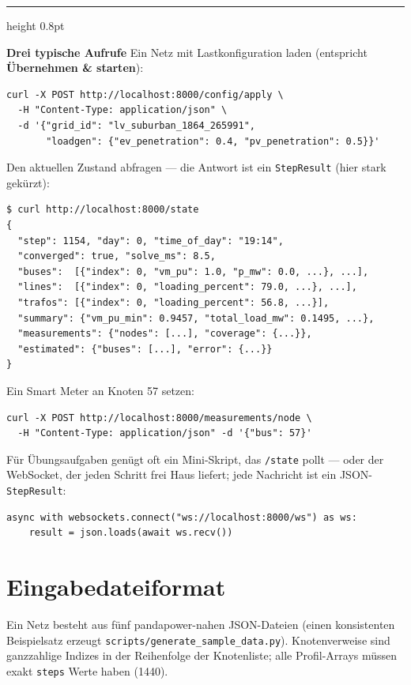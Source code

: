 \documentclass[11pt,a4paper,parskip=half]{scrreprt}
\newcommand{\ui}[1]{\textsf{\bfseries #1}}          %
\newcommand{\api}[1]{\texttt{#1}}                    %
\newenvironment{beispiel}[1][Beispiel]
  {\par\medskip
   {\color{bsp}\hrule height 0.8pt}\nopagebreak\smallskip
   \noindent\textbf{\textsf{\textcolor{bsp}{#1}}}\quad\ignorespaces}
  {\par\nopagebreak\smallskip{\color{bsp}\hrule height 0.8pt}\par\medskip}
\begin{document}
\begin{beispiel}[Drei typische Aufrufe]
Ein Netz mit Lastkonfiguration laden (entspricht \ui{Übernehmen \&
starten}):
\begin{lstlisting}
curl -X POST http://localhost:8000/config/apply \
  -H "Content-Type: application/json" \
  -d '{"grid_id": "lv_suburban_1864_265991",
       "loadgen": {"ev_penetration": 0.4, "pv_penetration": 0.5}}'
\end{lstlisting}

Den aktuellen Zustand abfragen --- die Antwort ist ein
\texttt{StepResult} (hier stark gekürzt):
\begin{lstlisting}
$ curl http://localhost:8000/state
{
  "step": 1154, "day": 0, "time_of_day": "19:14",
  "converged": true, "solve_ms": 8.5,
  "buses":  [{"index": 0, "vm_pu": 1.0, "p_mw": 0.0, ...}, ...],
  "lines":  [{"index": 0, "loading_percent": 79.0, ...}, ...],
  "trafos": [{"index": 0, "loading_percent": 56.8, ...}],
  "summary": {"vm_pu_min": 0.9457, "total_load_mw": 0.1495, ...},
  "measurements": {"nodes": [...], "coverage": {...}},
  "estimated": {"buses": [...], "error": {...}}
}
\end{lstlisting}

Ein Smart Meter an Knoten 57 setzen:
\begin{lstlisting}
curl -X POST http://localhost:8000/measurements/node \
  -H "Content-Type: application/json" -d '{"bus": 57}'
\end{lstlisting}

Für Übungsaufgaben genügt oft ein Mini-Skript, das \api{/state}
pollt --- oder der WebSocket, der jeden Schritt frei Haus liefert;
jede Nachricht ist ein JSON-\texttt{StepResult}:
\begin{lstlisting}
async with websockets.connect("ws://localhost:8000/ws") as ws:
    result = json.loads(await ws.recv())
\end{lstlisting}
\end{beispiel}

\chapter{Eingabedateiformat}

Ein Netz besteht aus fünf pandapower-nahen JSON-Dateien (einen
konsistenten Beispielsatz erzeugt
\texttt{scripts/generate\_sample\_data.py}). Knotenverweise sind
ganzzahlige Indizes in der Reihenfolge der Knotenliste; alle
Profil-Arrays müssen exakt \texttt{steps} Werte haben (1440).
\end{document}
